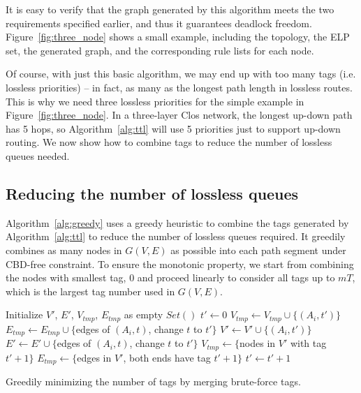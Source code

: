 It is easy to verify that the graph generated by this algorithm meets the two
requirements specified earlier, and thus it guarantees deadlock freedom.
Figure~\ref{fig:three_node} shows a small example, including the topology, the
ELP set, the generated graph, and the corresponding rule
lists for each node.

Of course, with just this basic algorithm, we may end up with too many tags
(i.e. lossless priorities) -- in fact, as many as the longest path length in
lossless routes. This is why we need three lossless priorities for
the simple example in Figure~\ref{fig:three_node}. In a three-layer Clos
network, the longest up-down path has 5 hops, so Algorithm~\ref{alg:ttl} will use 5
priorities just to support up-down routing. We now show how to combine tags to
reduce the number of lossless queues needed.

\subsection{Reducing the number of lossless queues}

Algorithm~\ref{alg:greedy} uses a greedy heuristic to combine the tags generated
by Algorithm~\ref{alg:ttl} to reduce the number of lossless queues required.  It
greedily combines as many nodes in $G(V,E)$ as possible into each path segment
under CBD-free constraint. To ensure the monotonic property, we start
from combining the nodes with smallest tag, 0 and proceed linearly to consider
all tags up to $mT$, which is the largest tag number used in $G(V,E)$.

\begin{algorithm}[t]
	\small
	Initialize $V'$, $E'$, $V_{tmp}$, $E_{tmp}$ as empty $Set()$\;
	$t' \gets 0$\;
	 {
		 {
			$V_{tmp} \gets V_{tmp} \cup \{(A_i, t')\}$\;
			$E_{tmp} \gets E_{tmp} \cup \{$edges of $(A_i, t)$, change $t$ to $t'\}$\;
			 {
				$V' \gets V' \cup \{(A_i, t')\}$\;
				$E' \gets E' \cup \{$edges of $(A_i, t)$, change $t$ to $t'\}$\;
			}
		}
		 {
			$V_{tmp} \gets \{$nodes in $V'$ with tag $t'+1\}$\;
			$E_{tmp} \gets \{$edges in $V'$, both ends have tag $t'+1\}$\;
			$t' \gets t'+1$\;
		}
	}
	\;
    \caption{Greedily minimizing the number of tags by merging brute-force tags.}
	\label{alg:greedy}
\end{algorithm}

